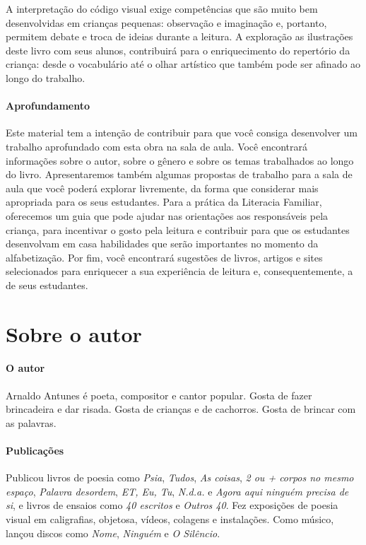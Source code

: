 \documentclass[11pt]{extarticle}
\begin{document}
A interpretação do código visual 
exige competências que são muito bem desenvolvidas em crianças pequenas: 
observação e imaginação e, portanto, permitem debate e troca de ideias durante 
a leitura. A exploração as ilustrações deste livro com seus alunos, contribuirá 
para o enriquecimento do repertório da criança: desde o vocabulário até o 
olhar artístico que também pode ser afinado ao longo do trabalho.

\paragraph{Aprofundamento} Este material tem a 
intenção de contribuir para que você consiga desenvolver um trabalho aprofundado 
com esta obra na sala de aula. Você encontrará informações sobre o autor, sobre 
o gênero e sobre os temas trabalhados ao longo do livro. Apresentaremos também 
algumas propostas de trabalho para a sala de aula que você poderá explorar livremente, 
da forma que considerar mais apropriada para os seus estudantes. Para a prática 
da Literacia Familiar, oferecemos um guia que pode ajudar nas orientações aos 
responsáveis pela criança, para incentivar o gosto pela leitura e contribuir para 
que os estudantes desenvolvam em casa habilidades que serão importantes no momento 
da alfabetização. Por fim, você encontrará sugestões de livros, artigos e sites 
selecionados para enriquecer a sua experiência de leitura e, 
consequentemente, a de seus estudantes.



\section{Sobre o autor}

\paragraph{O autor} 
Arnaldo Antunes é poeta, compositor e cantor popular.
Gosta de fazer brincadeira e dar risada.
Gosta de crianças e de cachorros.
Gosta de brincar com as palavras.

\paragraph{Publicações} Publicou livros de poesia como \emph{Psia}, \emph{Tudos}, 
\emph{As coisas}, \emph{2 ou + corpos no mesmo espaço}, \emph{Palavra desordem}, 
\emph{ET, Eu, Tu}, \emph{N.d.a.} e \emph{Agora aqui ninguém precisa de si}, 
e livros de ensaios como \emph{40 escritos} e \emph{Outros 40}.  
Fez exposições de poesia visual em caligrafias, objetosa, vídeos, colagens e instalações. 
Como músico, lançou discos como \emph{Nome}, \emph{Ninguém} e \emph{O Silêncio}.
\end{document}
